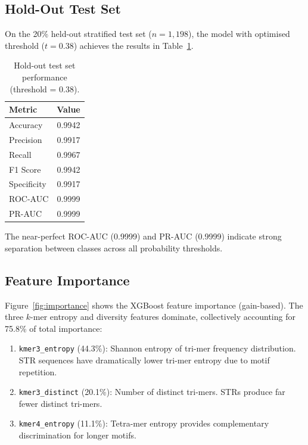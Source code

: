 \documentclass[11pt,twocolumn]{article}
\begin{document}
\subsection{Hold-Out Test Set}

On the 20\% held-out stratified test set ($n = 1{,}198$), the model
with optimised threshold ($t = 0.38$) achieves the results in
Table~\ref{tab:test_results}.

\begin{table}[t]
\centering
\caption{Hold-out test set performance (threshold = 0.38).}
\label{tab:test_results}
\begin{tabular}{@{}lc@{}}
\toprule
\textbf{Metric} & \textbf{Value} \\
\midrule
Accuracy & 0.9942 \\
Precision & 0.9917 \\
Recall & 0.9967 \\
F1 Score & 0.9942 \\
Specificity & 0.9917 \\
ROC-AUC & 0.9999 \\
PR-AUC & 0.9999 \\
\bottomrule
\end{tabular}
\end{table}

The near-perfect ROC-AUC (0.9999) and PR-AUC (0.9999) indicate
strong separation between classes across all probability thresholds.

\subsection{Feature Importance}

Figure~\ref{fig:importance} shows the XGBoost feature importance
(gain-based).  The three $k$-mer entropy and diversity features
dominate, collectively accounting for 75.8\% of total importance:

\begin{enumerate}[nosep]
    \item \texttt{kmer3\_entropy} (44.3\%): Shannon entropy of
          tri-mer frequency distribution.  STR sequences have
          dramatically lower tri-mer entropy due to motif repetition.
    \item \texttt{kmer3\_distinct} (20.1\%): Number of distinct
          tri-mers.  STRs produce far fewer distinct tri-mers.
    \item \texttt{kmer4\_entropy} (11.1\%): Tetra-mer entropy provides
          complementary discrimination for longer motifs.
\end{enumerate}
\end{document}
